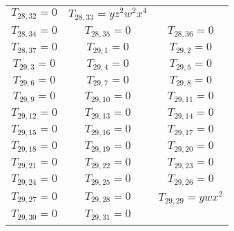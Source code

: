 \begin{longtable}{|c|c|c|}
$T_{28,32}= 0$&

$T_{28,33}= yz^2w^2x^4$\\

$T_{28,34}= 0$&

$T_{28,35}= 0$&

$T_{28,36}= 0$\\

$T_{28,37}= 0$&

$T_{29,1}= 0$&

$T_{29,2}= 0$\\

$T_{29,3}= 0$&

$T_{29,4}= 0$&

$T_{29,5}= 0$\\

$T_{29,6}= 0$&

$T_{29,7}= 0$&

$T_{29,8}= 0$\\

$T_{29,9}= 0$&

$T_{29,10}= 0$&

$T_{29,11}= 0$\\

$T_{29,12}= 0$&

$T_{29,13}= 0$&

$T_{29,14}= 0$\\

$T_{29,15}= 0$&

$T_{29,16}= 0$&

$T_{29,17}= 0$\\

$T_{29,18}= 0$&

$T_{29,19}= 0$&

$T_{29,20}= 0$\\

$T_{29,21}= 0$&

$T_{29,22}= 0$&

$T_{29,23}= 0$\\

$T_{29,24}= 0$&

$T_{29,25}= 0$&

$T_{29,26}= 0$\\

$T_{29,27}= 0$&

$T_{29,28}= 0$&

$T_{29,29}= ywx^2$\\

$T_{29,30}= 0$&

$T_{29,31}= 0$&


\end{longtable}
